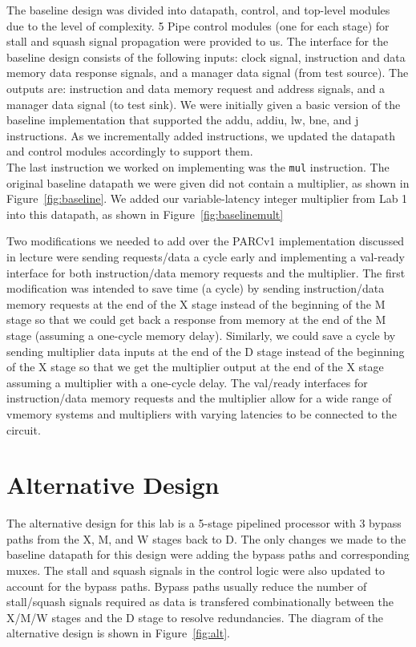 \documentclass[10pt]{article}
\begin{document}
The baseline design was divided into datapath, control, and top-level modules due to the level of complexity. 5 Pipe control modules (one for each stage) for stall and squash signal propagation were provided to us. The interface for the baseline design consists of the following inputs: clock signal, instruction and data memory data response signals, and a manager data signal (from test source). The outputs are: instruction and data memory request and address signals, and a manager data signal (to test sink). We were initially given a basic version of the baseline implementation that supported the addu, addiu, lw, bne, and j instructions. As we incrementally added instructions, we updated the datapath and control modules accordingly to support them. \\

The last instruction we worked on implementing was the \texttt{mul} instruction. The original baseline datapath we were given did not contain a multiplier, as shown in Figure~\ref{fig:baseline}. We added our variable-latency integer multiplier from Lab 1 into this datapath, as shown in Figure~\ref{fig:baselinemult}

Two modifications we needed to add over the PARCv1 implementation discussed in lecture were sending requests/data a cycle early and implementing a val-ready interface for both instruction/data memory requests and the multiplier. The first modification was intended to save time (a cycle) by sending instruction/data memory requests at the end of the X stage instead of the beginning of the M stage so that we could get back a response from memory at the end of the M stage (assuming a one-cycle memory delay). Similarly, we could save a cycle by sending multiplier data inputs at the end of the D stage instead of the beginning of the X stage so that we get the multiplier output at the end of the X stage assuming a multiplier with a one-cycle delay. The val/ready interfaces for instruction/data memory requests and the multiplier allow for a wide range of vmemory systems and multipliers with varying latencies to be connected to the circuit. 


\section{Alternative Design}

The alternative design for this lab is a 5-stage pipelined processor with 3 bypass paths from the X, M, and W stages back to D. The only changes we made to the baseline datapath for this design were adding the bypass paths and corresponding muxes. The stall and squash signals in the control logic were also updated to account for the bypass paths. Bypass paths usually reduce the number of stall/squash signals required as data is transfered combinationally between the X/M/W stages and the D stage to resolve redundancies. The diagram of the alternative design is shown in Figure~\ref{fig:alt}. \\
\end{document}
